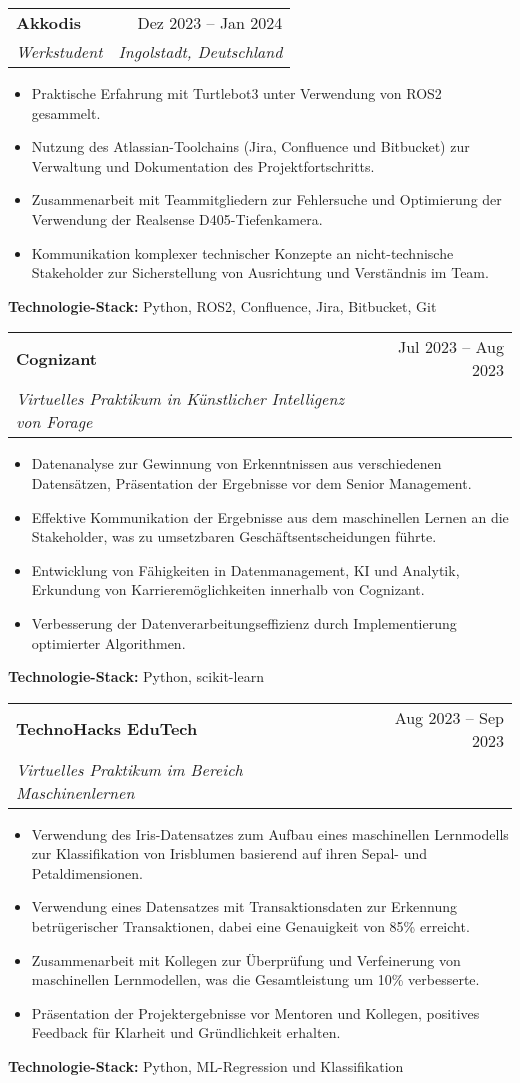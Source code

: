 \documentclass[letterpaper,10pt]{article}
\makeatletter
\newcommand{\resumeItem}[1]{\item\small{#1 \vspace{-2pt}}}
\newcommand{\resumeSubheading}[4]{
  \vspace{-2pt}\item
    \begin{tabular*}{0.97\textwidth}[t]{l@{\extracolsep{\fill}}r}
      \textbf{#1} & #2 \\
      \textit{\small#3} & \textit{\small #4} \\
    \end{tabular*}\vspace{-7pt}
}
\newcommand{\resumeItemListStart}{\begin{itemize}}
\newcommand{\resumeItemListEnd}{\end{itemize}\vspace{-5pt}}
\makeatother
\begin{document}
    \resumeSubheading
      {Akkodis}{Dez 2023 -- Jan 2024}
      {Werkstudent}{Ingolstadt, Deutschland}
      \resumeItemListStart
        \resumeItem{Praktische Erfahrung mit Turtlebot3 unter Verwendung von ROS2 gesammelt.}
        \resumeItem{Nutzung des Atlassian-Toolchains (Jira, Confluence und Bitbucket) zur Verwaltung und Dokumentation des Projektfortschritts.}
        \resumeItem{Zusammenarbeit mit Teammitgliedern zur Fehlersuche und Optimierung der Verwendung der Realsense D405-Tiefenkamera.}
        \resumeItem{Kommunikation komplexer technischer Konzepte an nicht-technische Stakeholder zur Sicherstellung von Ausrichtung und Verständnis im Team.}
      \resumeItemListEnd
      \hspace*{\labelsep}\textbf{Technologie-Stack:} Python, ROS2, Confluence, Jira, Bitbucket, Git

    \resumeSubheading
      {Cognizant}{Jul 2023 -- Aug 2023}
      {Virtuelles Praktikum in Künstlicher Intelligenz von Forage}{}
      \resumeItemListStart
        \resumeItem{Datenanalyse zur Gewinnung von Erkenntnissen aus verschiedenen Datensätzen, Präsentation der Ergebnisse vor dem Senior Management.}
        \resumeItem{Effektive Kommunikation der Ergebnisse aus dem maschinellen Lernen an die Stakeholder, was zu umsetzbaren Geschäftsentscheidungen führte.}
        \resumeItem{Entwicklung von Fähigkeiten in Datenmanagement, KI und Analytik, Erkundung von Karrieremöglichkeiten innerhalb von Cognizant.}
        \resumeItem{Verbesserung der Datenverarbeitungseffizienz durch Implementierung optimierter Algorithmen.}
      \resumeItemListEnd
      \hspace*{\labelsep}\textbf{Technologie-Stack:} Python, scikit-learn

    \resumeSubheading
      {TechnoHacks EduTech}{Aug 2023 -- Sep 2023}
      {Virtuelles Praktikum im Bereich Maschinenlernen}{}
      \resumeItemListStart
        \resumeItem{Verwendung des Iris-Datensatzes zum Aufbau eines maschinellen Lernmodells zur Klassifikation von Irisblumen basierend auf ihren Sepal- und Petaldimensionen.}
        \resumeItem{Verwendung eines Datensatzes mit Transaktionsdaten zur Erkennung betrügerischer Transaktionen, dabei eine Genauigkeit von 85\% erreicht.}
        \resumeItem{Zusammenarbeit mit Kollegen zur Überprüfung und Verfeinerung von maschinellen Lernmodellen, was die Gesamtleistung um 10\% verbesserte.}
        \resumeItem{Präsentation der Projektergebnisse vor Mentoren und Kollegen, positives Feedback für Klarheit und Gründlichkeit erhalten.}
      \resumeItemListEnd
      \hspace*{\labelsep}\textbf{Technologie-Stack:} Python, ML-Regression und Klassifikation
\end{document}
